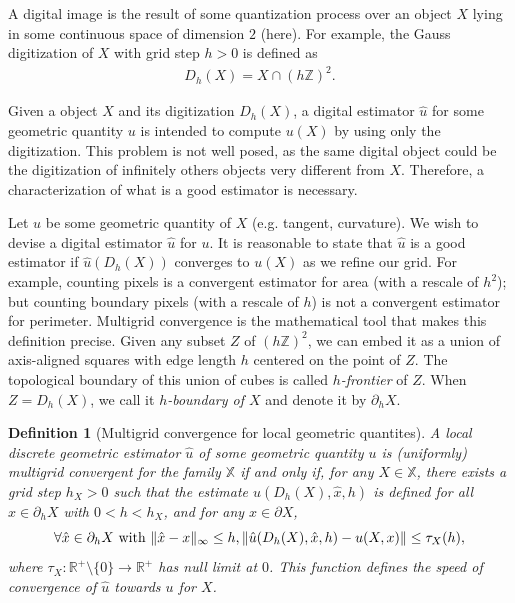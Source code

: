 \documentclass[runningheads]{llncs}
\newtheorem{ddef}{Definition}
\DeclarePairedDelimiter\norm{\lVert}{\rVert}%
\begin{document}
A digital image is the result of some quantization process over an object $X$ lying in some continuous space of dimension $2$ (here).  For example, the Gauss digitization of $X$ with grid step $h>0$ is defined as
\begin{align*}
	D_h(X) = X \cap (h\mathbb{Z})^2.
\end{align*} 

Given a object $X$ and its digitization $D_h(X)$, a digital estimator $\hat{u}$ for some geometric quantity $u$ is intended to compute $u(X)$ by using only the digitization. This problem is not well posed, as the same digital object could be the digitization of infinitely others objects very different from $X$. Therefore, a characterization of what is a good estimator is necessary.

Let $u$ be some geometric quantity of $X$ (e.g. tangent,
curvature). We wish to devise a digital estimator $\hat{u}$ for
$u$. It is reasonable to state that $\hat{u}$ is a good estimator if
$\hat{u}(D_h(X))$ converges to $u(X)$ as we refine our grid. For
example, counting pixels is a convergent estimator for area (with a
rescale of $h^2$); but counting boundary pixels (with a rescale of
$h$) is not a convergent estimator for perimeter. Multigrid
convergence is the mathematical tool that makes this definition
precise. Given any subset $Z$ of $(h\mathbb{Z})^2$, we can embed it as
a union of axis-aligned squares with edge length $h$ centered on the
point of $Z$. The topological boundary of this union of cubes is
called {\em $h$-frontier} of $Z$. When $Z=D_h(X)$, we call it {\em
  $h$-boundary of $X$} and denote it by $\partial_h X$. 

\begin{ddef}[Multigrid convergence for local geometric quantites]
  A local discrete geometric estimator $\hat{u}$ of some geometric
  quantity $u$ is (uniformly) multigrid convergent for the family $\mathbb{X}$ if
  and only if, for any $X \in \mathbb{X}$, there exists a grid step
  $h_X>0$ such that the estimate $\hat{u}(D_h(X),\hat{x},h)$ is
  defined for all $\hat{x} \in \partial_hX$ with $ 0 < h < h_X$, and
  for any $x \in \partial X$,
  \begin{equation*}
    \forall \hat{x} \in  \partial_hX \text{ with } \norm{ \hat{x} - x }_{\infty} \leq h, \norm{ \hat{u}(D_h(X),\hat{x},h) - u(X,x)} \leq \tau_{X}(h),			
  \end{equation*}
  where $\tau_{X}:\mathbb{R}^{+}\setminus\{0\} \rightarrow
  \mathbb{R}^{+}$ has null limit at $0$. This function defines the
  speed of convergence of $\hat{u}$ towards $u$ for $X$.
\end{ddef}
	
\end{document}
